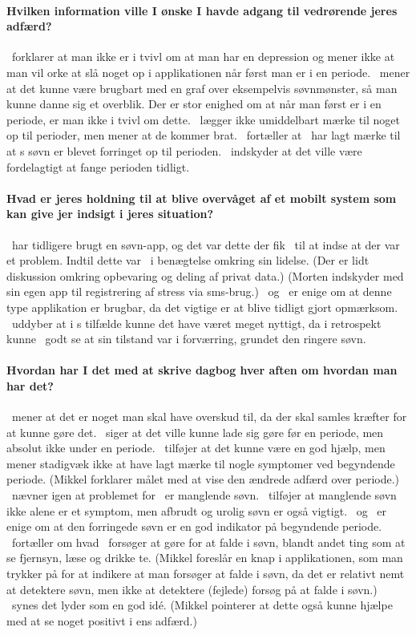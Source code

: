 \paragraph{Hvilken information ville I ønske I havde adgang til vedrørende jeres adfærd?}
\pe~forklarer at man ikke er i tvivl om at man har en depression og mener ikke at man vil orke at slå noget op i applikationen når først man er i en periode.
\pa~mener at det kunne være brugbart med en graf over eksempelvis søvnmønster, så man kunne danne sig et overblik.
Der er stor enighed om at når man først er i en periode, er man ikke i tvivl om dette.
\pe~lægger ikke umiddelbart mærke til noget op til perioder, men mener at de kommer brat.
\pa~fortæller at \pa~har lagt mærke til at \pa s søvn er blevet forringet op til perioden.
\pa~indskyder at det ville være fordelagtigt at fange perioden tidligt.

\paragraph{Hvad er jeres holdning til at blive overvåget af et mobilt system som kan give jer indsigt i jeres situation?}
\pc~har tidligere brugt en søvn-app, og det var dette der fik \pc~til at indse at der var et problem.
Indtil dette var \pc~i benægtelse omkring sin lidelse.
(Der er lidt diskussion omkring opbevaring og deling af privat data.)
(Morten indskyder med sin egen app til registrering af stress via sms-brug.)
\pa~og \pe~er enige om at denne type applikation er brugbar, da det vigtige er at blive tidligt gjort opmærksom.
\pa~uddyber at i \pa s tilfælde kunne det have været meget nyttigt, da i retrospekt kunne \pa~godt se at sin tilstand var i forværring, grundet den ringere søvn.

\paragraph{Hvordan har I det med at skrive dagbog hver aften om hvordan man har det?}
\pd~mener at det er noget man skal have overskud til, da der skal samles kræfter for at kunne gøre det.
\pe~siger at det ville kunne lade sig gøre før en periode, men absolut ikke under en periode.
\pe~tilføjer at det kunne være en god hjælp, men mener stadigvæk ikke at have lagt mærke til nogle symptomer ved begyndende periode.
(Mikkel forklarer målet med at vise den ændrede adfærd over periode.)
\pa~nævner igen at problemet for \pa~er manglende søvn.
\pe~tilføjer at manglende søvn ikke alene er et symptom, men afbrudt og urolig søvn er også vigtigt.
\pe~og \pd~er enige om at den forringede søvn er en god indikator på begyndende periode.
\pa~fortæller om hvad \pa~forsøger at gøre for at falde i søvn, blandt andet ting som at se fjernsyn, læse og drikke te.
(Mikkel foreslår en knap i applikationen, som man trykker på for at indikere at man forsøger at falde i søvn, da det er relativt nemt at detektere søvn, men ikke at detektere (fejlede) forsøg på at falde i søvn.)
\pa~synes det lyder som en god idé.
(Mikkel pointerer at dette også kunne hjælpe med at se noget positivt i ens adfærd.)

